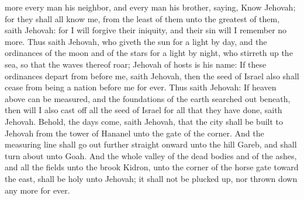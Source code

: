more every man his neighbor, and every man his brother, saying, Know Jehovah; for they shall all know me, from the least of them unto the greatest of them, saith Jehovah: for I will forgive their iniquity, and their sin will I remember no more.  Thus saith Jehovah, who giveth the sun for a light by day, and the ordinances of the moon and of the stars for a light by night, who stirreth up the sea, so that the waves thereof roar; Jehovah of hosts is his name: If these ordinances depart from before me, saith Jehovah, then the seed of Israel also shall cease from being a nation before me for ever. Thus saith Jehovah: If heaven above can be measured, and the foundations of the earth searched out beneath, then will I also cast off all the seed of Israel for all that they have done, saith Jehovah.  Behold, the days come, saith Jehovah, that the city shall be built to Jehovah from the tower of Hananel unto the gate of the corner. And the measuring line shall go out further straight onward unto the hill Gareb, and shall turn about unto Goah. And the whole valley of the dead bodies and of the ashes, and all the fields unto the brook Kidron, unto the corner of the horse gate toward the east, shall be holy unto Jehovah; it shall not be plucked up, nor thrown down any more for ever. 

